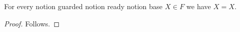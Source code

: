 

\begin{proposition}\label{notion_bound_does_not_make_sibling_modifiers_sequential}
    For every notion guarded notion ready notion base $X\in F$ we have $X=X$.
\end{proposition}
\begin{proof}
    Follows.
\end{proof}
